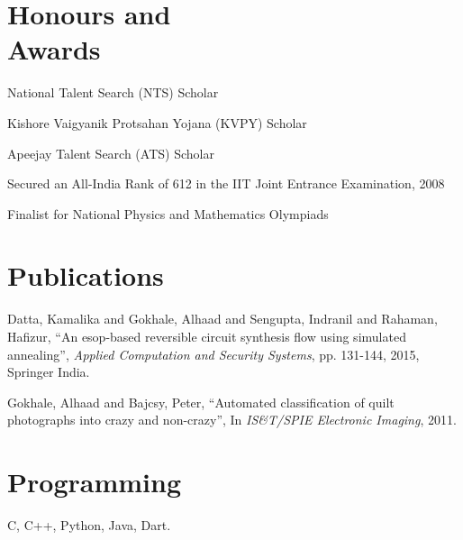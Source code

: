 \documentclass[margin,line]{resume}
\begin{document}
\begin{resume}
    \section{\mysidestyle Honours and\\Awards} 

    \begin{list2}
        \item National Talent Search (NTS) Scholar
        \item Kishore Vaigyanik Protsahan Yojana (KVPY) Scholar
        \item Apeejay Talent Search (ATS) Scholar
        \item Secured an All-India Rank of 612 in the IIT Joint Entrance Examination, 2008
        \item Finalist for National Physics and Mathematics Olympiads
    \end{list2}\vspace{-1.5mm}


    \section{\mysidestyle Publications}

    Datta, Kamalika and Gokhale, Alhaad and Sengupta, Indranil and Rahaman, Hafizur, 
    ``An esop-based reversible circuit synthesis flow using simulated annealing'',
    \textsl{Applied Computation and Security Systems}, pp. 131-144, 2015, Springer India.

\vspace{-2mm}
    Gokhale, Alhaad and Bajcsy, Peter,
    ``Automated classification of quilt photographs into crazy and non-crazy'',
    In \textsl{IS\&T/SPIE Electronic Imaging}, 2011.


    \section{\mysidestyle Programming} 

    C, C++, Python, Java, Dart.


\end{resume}
\end{document}
